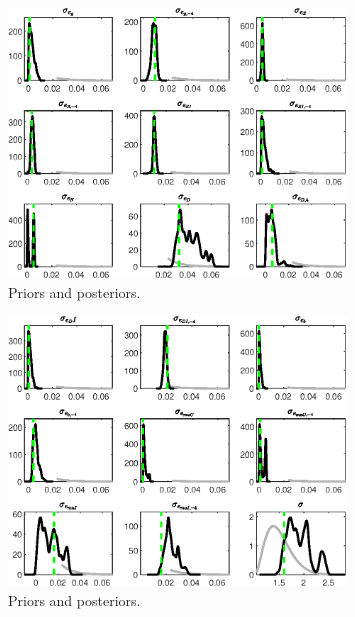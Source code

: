  
\begin{figure}[H]
\centering
\includegraphics[width=0.80\textwidth]{BRS_sectoral/Output/BRS_sectoral_PriorsAndPosteriors1}
\caption{Priors and posteriors.}\label{Fig:PriorsAndPosteriors:1}
\end{figure}
 
\begin{figure}[H]
\centering
\includegraphics[width=0.80\textwidth]{BRS_sectoral/Output/BRS_sectoral_PriorsAndPosteriors2}
\caption{Priors and posteriors.}\label{Fig:PriorsAndPosteriors:2}
\end{figure}
 
